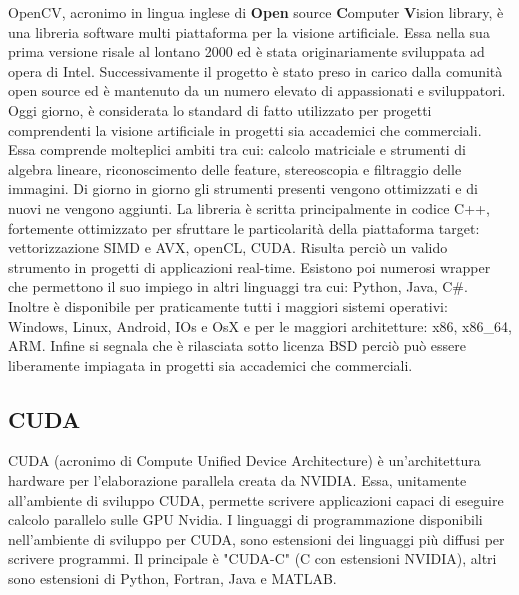 OpenCV, acronimo in lingua inglese di \textbf{Open} source \textbf{C}omputer \textbf{V}ision library, è una libreria software multi piattaforma per la visione artificiale. Essa nella sua prima versione risale al lontano 2000 ed è stata originariamente sviluppata ad opera di Intel. Successivamente il progetto è stato preso in carico dalla comunità open source ed è mantenuto da un numero elevato di appassionati e sviluppatori. Oggi giorno, è considerata lo standard di fatto utilizzato per progetti comprendenti la visione artificiale in progetti sia accademici che commerciali. Essa comprende molteplici ambiti tra cui: calcolo matriciale e strumenti di algebra lineare, riconoscimento delle feature, stereoscopia e filtraggio delle immagini. Di giorno in giorno gli strumenti presenti vengono ottimizzati e di nuovi ne vengono aggiunti. 
La libreria è scritta principalmente in codice C++, fortemente ottimizzato per sfruttare le particolarità della piattaforma target: vettorizzazione SIMD e AVX, openCL, CUDA. Risulta perciò un valido strumento in progetti di applicazioni real-time. Esistono poi numerosi wrapper che permettono il suo impiego in altri linguaggi tra cui: Python, Java, C\#. Inoltre è disponibile per praticamente tutti i maggiori sistemi operativi: Windows, Linux, Android, IOs e OsX e per le maggiori architetture: x86, x86\_64, ARM.
Infine si segnala che è rilasciata sotto licenza BSD perciò può essere liberamente impiagata in progetti sia accademici che commerciali.

\subsection{CUDA}
\label{sec:tools:cuda}
CUDA (acronimo di Compute Unified Device Architecture) è un'architettura hardware per l'elaborazione parallela creata da NVIDIA. Essa, unitamente all'ambiente di sviluppo CUDA, permette scrivere applicazioni capaci di eseguire calcolo parallelo sulle GPU Nvidia. I linguaggi di programmazione disponibili nell'ambiente di sviluppo per CUDA, sono estensioni dei linguaggi più diffusi per scrivere programmi. Il principale è "CUDA-C" (C con estensioni NVIDIA), altri sono estensioni di Python, Fortran, Java e MATLAB.

